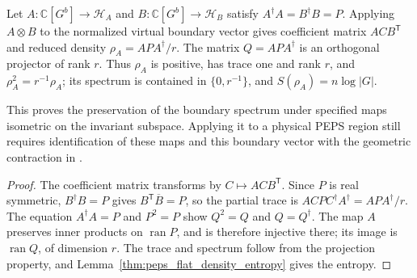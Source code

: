 \begin{lemma}%
    \label{thm:peps_regular_boundary_physical_realization}
    \leanok
    Let $A:\mathbb C[G^b]\to\mathcal H_A$ and
    $B:\mathbb C[G^b]\to\mathcal H_B$ satisfy $A^\dagger A=B^\dagger B=P$.
    Applying $A\otimes B$ to the normalized virtual boundary vector gives
    coefficient matrix $ACB^{\mathsf T}$ and reduced density
    $\rho_A=APA^\dagger/r$. The matrix $Q=APA^\dagger$ is an orthogonal
    projector of rank $r$. Thus $\rho_A$ is positive, has trace one and
    rank $r$, and $\rho_A^2=r^{-1}\rho_A$; its spectrum is contained in
    $\{0,r^{-1}\}$, and $S(\rho_A)=n\log|G|$.

    This proves the preservation of the boundary spectrum under specified
    maps isometric on the invariant subspace. Applying it to a physical
    PEPS region still requires identification of these maps and this
    boundary vector with the geometric contraction in
    \cite[Theorem~6.9]{Schuch2010PEPS}.
\end{lemma}
\begin{proof}\leanok
    The coefficient matrix transforms by $C\mapsto ACB^{\mathsf T}$.
    Since $P$ is real symmetric, $B^\dagger B=P$ gives
    $B^{\mathsf T}\overline B=P$, so the partial trace is
    $ACPC^\dagger A^\dagger=APA^\dagger/r$.
    The equation $A^\dagger A=P$ and $P^2=P$ show $Q^2=Q$ and
    $Q=Q^\dagger$. The map $A$ preserves inner products on
    $\operatorname{ran}P$, and is therefore injective there; its image
    is $\operatorname{ran}Q$, of dimension $r$. The trace and spectrum
    follow from the projection property, and
    Lemma~\ref{thm:peps_flat_density_entropy} gives the entropy.
\end{proof}

